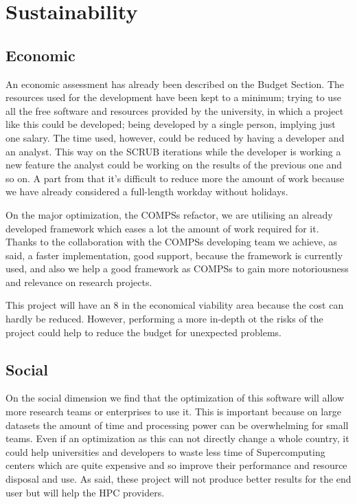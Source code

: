 \chapter{Sustainability}

\section{Economic}

An economic assessment has already been described on the Budget Section. The resources used for the development have been kept to a minimum; trying to use all the free software and resources provided by the university, in which a project like this could be developed; being developed by a single person, implying just one salary. The time used, however, could be reduced by having a developer and an analyst. This way on the SCRUB iterations while the developer is working a new feature the analyst could be working on the results of the previous one and so on. A part from that it's difficult to reduce more the amount of work because we have already considered a full-length workday without holidays.

On the major optimization, the COMPSs refactor, we are utilising an already developed framework which eases a lot the amount of work required for it. Thanks to the collaboration with the COMPSs developing team we achieve, as said, a faster implementation, good support, because the framework is currently used, and also we help a good framework as COMPSs to gain more notoriousness and relevance on research projects.

This project will have an 8 in the economical viability area because the cost can hardly be reduced. However, performing a more in-depth ot the risks of the project could help to reduce the budget for unexpected problems.



\section{Social}

On the social dimension we find that the optimization of this software will allow more research teams or enterprises to use it. This is important because on large datasets the amount of time and processing power can be overwhelming for small teams. Even if an optimization as this can not directly change a whole country, it could help universities and developers to waste less time of Supercomputing centers which are quite expensive and so improve their performance and resource disposal and use. As said, these project will not produce better results for the end user but will help the HPC providers.

